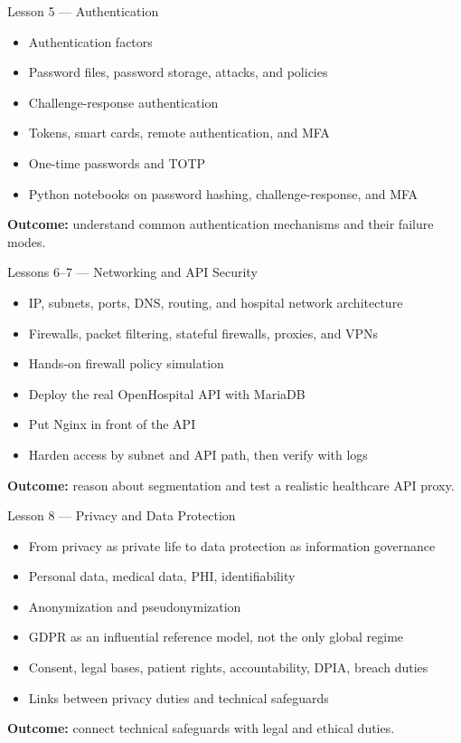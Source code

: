 \documentclass[presentation]{beamer}
\begin{document}
\begin{frame}[c]{Lesson 5 --- Authentication}
\begin{itemize}
    \item Authentication factors
    \item Password files, password storage, attacks, and policies
    \item Challenge-response authentication
    \item Tokens, smart cards, remote authentication, and MFA
    \item One-time passwords and TOTP
    \item Python notebooks on password hashing, challenge-response, and MFA
\end{itemize}
\bigskip
\textbf{Outcome:} understand common authentication mechanisms and their failure modes.
\end{frame}

\begin{frame}[c]{Lessons 6--7 --- Networking and API Security}
\begin{itemize}
    \item IP, subnets, ports, DNS, routing, and hospital network architecture
    \item Firewalls, packet filtering, stateful firewalls, proxies, and VPNs
    \item Hands-on firewall policy simulation
    \item Deploy the real OpenHospital API with MariaDB
    \item Put Nginx in front of the API
    \item Harden access by subnet and API path, then verify with logs
\end{itemize}
\bigskip
\textbf{Outcome:} reason about segmentation and test a realistic healthcare API proxy.
\end{frame}

\begin{frame}[c]{Lesson 8 --- Privacy and Data Protection}
\begin{itemize}
    \item From privacy as private life to data protection as information governance
    \item Personal data, medical data, PHI, identifiability
    \item Anonymization and pseudonymization
    \item GDPR as an influential reference model, not the only global regime
    \item Consent, legal bases, patient rights, accountability, DPIA, breach duties
    \item Links between privacy duties and technical safeguards \cite{health_privacy_2025}
\end{itemize}
\bigskip
\textbf{Outcome:} connect technical safeguards with legal and ethical duties.
\end{frame}
\end{document}
